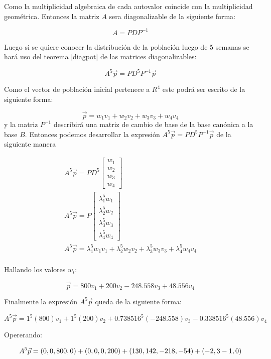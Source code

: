 Como la multiplicidad algebraica de cada autovalor coincide con la multiplicidad geométrica. Entonces la matriz $A$ sera diagonalizable de la siguiente forma:

\[
    A = PDP^{-1}
\]

Luego si se quiere conocer la distribución de la población luego de 5 semanas se hará uso del teorema \ref{diagpot} de las matrices diagonalizables:

\[
    A^5\vec{p} = PD^5P^{-1}\vec{p}
\]

Como el vector de población inicial pertenece a $R^4$ este podrá ser escrito de la siguiente forma:

\[
    \vec{p} = w_1v_1 + w_2v_2 + w_3v_3 + w_4v_4
\]
 y la matriz $P^{-1}$ describirá una matriz de cambio de base de la base canónica a la base $B$. Entonces podemos desarrollar la expresión $A^5\vec{p} = PD^5P^{-1}\vec{p}$ de  la siguiente manera

 \begin{gather*}
    A^5\vec{p} = P D^5 \left[\begin{array}{c} w_1\\ w_2\\ w_3\\ w_4 \end{array}\right]\\
    A^5\vec{p} = P \left[\begin{array}{c} \lambda_1^5w_1\\ \lambda_2^5w_2\\ \lambda_3^5w_3\\ \lambda_4^5w_4 \end{array}\right]\\
    A^5\vec{p} = \lambda_1^5w_1v_1 + \lambda_2^5w_2v_2 + \lambda_3^5w_3v_3 + \lambda_4^5w_4v_4\\
 \end{gather*}

 Hallando los valores $w_i$:

 \[
    \vec{p} = 800v_1 + 200v_2 - 248.558 v_3 + 48.556 v_4
 \]

 Finalmente la expresión $A^5\vec{p}$ queda de la siguiente forma:

 \[
        A^5\vec{p} = 1^5(800)v_1 + 1^5(200)v_2 + 0.738516^5(-248.558)v_3 -0.338516^5(48.556)v_4
 \]

 Opererando:

 \[
    A^5\vec{p} = (0,0,800,0) + (0,0,0,200) + (130,142,-218,-54) + (-2,3-1,0)\\
\]


